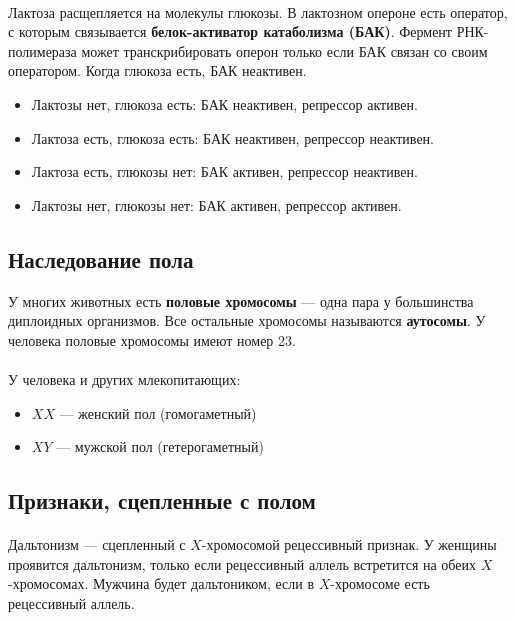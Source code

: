\documentclass[dvipdfmx]{article}
\begin{document}
\paragraph{}
Лактоза расщепляется на молекулы глюкозы.
В лактозном опероне есть оператор, с которым связывается \textbf{белок-активатор катаболизма (БАК)}.
Фермент РНК-полимераза может транскрибировать оперон только если БАК связан со своим оператором.
Когда глюкоза есть, БАК неактивен.

\begin{itemize}
\item
  Лактозы нет, глюкоза есть: БАК неактивен, репрессор активен.
\item
  Лактоза есть, глюкоза есть: БАК неактивен, репрессор неактивен.
\item
  Лактоза есть, глюкозы нет: БАК активен, репрессор неактивен.
\item
  Лактозы нет, глюкозы нет: БАК активен, репрессор активен.
\end{itemize}

\subsection{Наследование пола}

У многих животных есть \textbf{половые хромосомы} --- одна пара у большинства диплоидных организмов.
Все остальные хромосомы называются \textbf{аутосомы}.
У человека половые хромосомы имеют номер 23.

\paragraph{}
У человека и других млекопитающих:
\begin{itemize}
\item
  $XX$ --- женский пол (гомогаметный)
\item
  $XY$ --- мужской пол (гетерогаметный)
\end{itemize}

\subsection{Признаки, сцепленные с полом}

\paragraph{}
Дальтонизм --- сцепленный с $X$-хромосомой рецессивный признак. У женщины проявится дальтонизм, только если рецессивный
аллель встретится на обеих $X$-хромосомах. Мужчина будет дальтоником, если в $X$-хромосоме есть рецессивный аллель.
\end{document}
